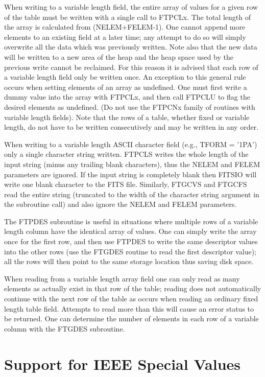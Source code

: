 \documentclass[11pt]{book}
\begin{document}
When writing to a variable length field, the entire array of values for
a given row of the table must be written with a single call to FTPCLx.
The total length of the array is calculated from (NELEM+FELEM-1). One
cannot append more elements to an existing field at a later time; any
attempt to do so will simply overwrite all the data which was previously
written. Note also that the new data will be written to a new area of
the heap and the heap space used by the previous write cannot be
reclaimed. For this reason it is advised that each row of a variable
length field only be written once. An exception to this general rule
occurs when setting elements of an array as undefined. One must first
write a dummy value into the array with FTPCLx, and then call FTPCLU to
flag the desired elements as undefined. (Do not use the FTPCNx family
of routines with variable length fields). Note that the rows of a table,
whether fixed or variable length, do not have to be written
consecutively and may be written in any order.

When writing to a variable length ASCII character field (e.g., TFORM =
'1PA') only a single character string written.  FTPCLS writes the whole
length of the input string (minus any trailing blank characters), thus
the NELEM and FELEM parameters are ignored.  If the input string is
completely blank then FITSIO will write one blank character to the FITS
file.  Similarly, FTGCVS and FTGCFS read the entire string (truncated
to the width of the character string argument in the subroutine call)
and also ignore the NELEM and FELEM parameters.

The FTPDES subroutine is useful in situations where multiple rows of a
variable length column have the identical array of values.  One can
simply write the array once for the first row, and then use FTPDES to
write the same descriptor values into the other rows (use the FTGDES
routine to read the first descriptor value);  all the rows will then
point to the same storage location thus saving disk space.

When reading from a variable length array field one can only read as
many elements as actually exist in that row of the table; reading does
not automatically continue with the next row of the table as occurs
when reading an ordinary fixed length table field.  Attempts to read
more than this will cause an error status to be returned.  One can
determine the number of elements in each row of a variable column with
the FTGDES subroutine.


\section{Support for IEEE Special Values}
\end{document}
